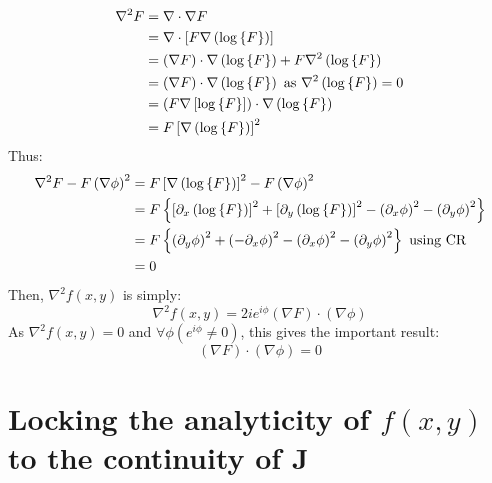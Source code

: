 \documentclass{article}
\begin{document}
\begin{align}
    \nabla^2 F &= \nabla \cdot \nabla F \\
               &= \nabla \cdot \left[ F \nabla \left( \log \left\{ F \right\} \right) \right]
    \\
    &= \left( \nabla F \right) \cdot \nabla \left( \log \left\{ F \right\} \right) + F \nabla^2
    \left( \log \left\{ F \right\} \right) \\
    &= \left( \nabla F \right) \cdot \nabla \left( \log \left\{ F \right\} \right)
    ~\textrm{as}~ \nabla^2 \left( \log \left\{ F \right\} \right) = 0 \\
    &= \left( F \nabla \left[ \log \left\{ F \right\} \right] \right) \cdot \nabla \left(
    \log \left\{ F \right\} \right) \\
    &= F \left[ \nabla \left( \log \left\{ F \right\} \right) \right]^2
\end{align}
Thus:
\begin{align}
    \nabla^2 F - F \left( \nabla \phi \right)^2 &= F \left[ \nabla \left( \log \left\{ F \right\}
        \right) \right]^2 - F \left( \nabla \phi \right)^2 \\
    &= F \left\{ \left[ \partial_x \left( \log \left\{ F \right\} \right) \right]^2
       + \left[ \partial_y \left( \log \left\{ F \right\} \right) \right]^2
       - \left( \partial_x \phi \right)^2
       - \left( \partial_y \phi \right)^2 \right\} \\
    &= F \left\{ \left( \partial_y \phi \right)^2
       + \left( - \partial_x \phi \right)^2
       - \left( \partial_x \phi \right)^2
       - \left( \partial_y \phi \right)^2 \right\} ~\textrm{using CR}\\
    &= 0
\end{align}
Then, $\nabla^2 f(x,y)$ is simply:
\begin{equation}
    \nabla^2 f(x,y) = 2 i e^{i \phi} \left( \nabla F \right) \cdot \left( \nabla
        \phi \right)
\end{equation}
As $\nabla^2 f(x,y) = 0$ and $\forall \phi \left( e^{i \phi} \neq 0 \right)$,
this gives the important result:
\begin{equation}
    \left( \nabla F \right) \cdot \left( \nabla \phi \right) = 0
\end{equation}

\section{Locking the analyticity of $f(x,y)$ to the continuity of $\mathbf{J}$}
\end{document}
